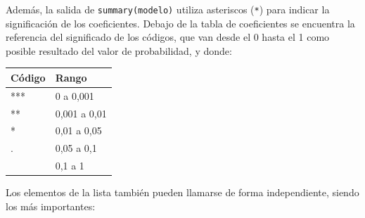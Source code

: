 \documentclass[
  spanish,
  a4paper,
]{scrbook}
\newcounter{none} %
\begin{document}
Además, la salida de \texttt{summary(modelo)} utiliza asteriscos
(\texttt{*}) para indicar la significación de los coeficientes. Debajo
de la tabla de coeficientes se encuentra la referencia del significado
de los códigos, que van desde el 0 hasta el 1 como posible resultado del
valor de probabilidad, y donde:

{\def\LTcaptype{none} %
\begin{longtable}[]{@{}ll@{}}
\toprule\noalign{}
Código & Rango \\
\midrule\noalign{}
\endhead
\bottomrule\noalign{}
\endlastfoot
*** & 0 a 0,001 \\
** & 0,001 a 0,01 \\
* & 0,01 a 0,05 \\
. & 0,05 a 0,1 \\
& 0,1 a 1 \\
\end{longtable}
}

Los elementos de la lista también pueden llamarse de forma
independiente, siendo los más importantes:
\end{document}
